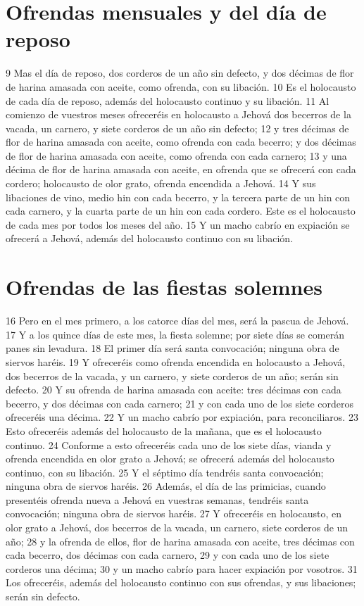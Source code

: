 \section*{Ofrendas mensuales y del día de reposo}

9 Mas el día de reposo, dos corderos de un año sin defecto, y dos décimas de flor de harina amasada con aceite, como ofrenda, con su libación.
10 Es el holocausto de cada día de reposo, además del holocausto continuo y su libación.
11 Al comienzo de vuestros meses ofreceréis en holocausto a Jehová dos becerros de la vacada, un carnero, y siete corderos de un año sin defecto;
12 y tres décimas de flor de harina amasada con aceite, como ofrenda con cada becerro; y dos décimas de flor de harina amasada con aceite, como ofrenda con cada carnero;
13 y una décima de flor de harina amasada con aceite, en ofrenda que se ofrecerá con cada cordero; holocausto de olor grato, ofrenda encendida a Jehová.
14 Y sus libaciones de vino, medio hin   con cada becerro, y la tercera parte de un hin con cada carnero, y la cuarta parte de un hin con cada cordero. Este es el holocausto de cada mes por todos los meses del año.
15 Y un macho cabrío en expiación se ofrecerá a Jehová, además del holocausto continuo con su libación.
\section*{Ofrendas de las fiestas solemnes }

16 Pero en el mes primero, a los catorce días del mes, será la pascua de Jehová.
17 Y a los quince días de este mes, la fiesta solemne; por siete días se comerán panes sin levadura. 
18 El primer día será santa convocación; ninguna obra de siervos haréis.
19 Y ofreceréis como ofrenda encendida en holocausto a Jehová, dos becerros de la vacada, y un carnero, y siete corderos de un año; serán sin defecto.
20 Y su ofrenda de harina amasada con aceite: tres décimas con cada becerro, y dos décimas con cada carnero;
21 y con cada uno de los siete corderos ofreceréis una décima.
22 Y un macho cabrío por expiación, para reconciliaros.
23 Esto ofreceréis además del holocausto de la mañana, que es el holocausto continuo.
24 Conforme a esto ofreceréis cada uno de los siete días, vianda y ofrenda encendida en olor grato a Jehová; se ofrecerá además del holocausto continuo, con su libación.
25 Y el séptimo día tendréis santa convocación; ninguna obra de siervos haréis.
26 Además, el día de las primicias, cuando presentéis ofrenda nueva a Jehová en vuestras semanas, tendréis santa convocación; ninguna obra de siervos haréis.
27 Y ofreceréis en holocausto, en olor grato a Jehová, dos becerros de la vacada, un carnero, siete corderos de un año;
28 y la ofrenda de ellos, flor de harina amasada con aceite, tres décimas con cada becerro, dos décimas con cada carnero,
29 y con cada uno de los siete corderos una décima;
30 y un macho cabrío para hacer expiación por vosotros.
31 Los ofreceréis, además del holocausto continuo con sus ofrendas, y sus libaciones; serán sin defecto.

